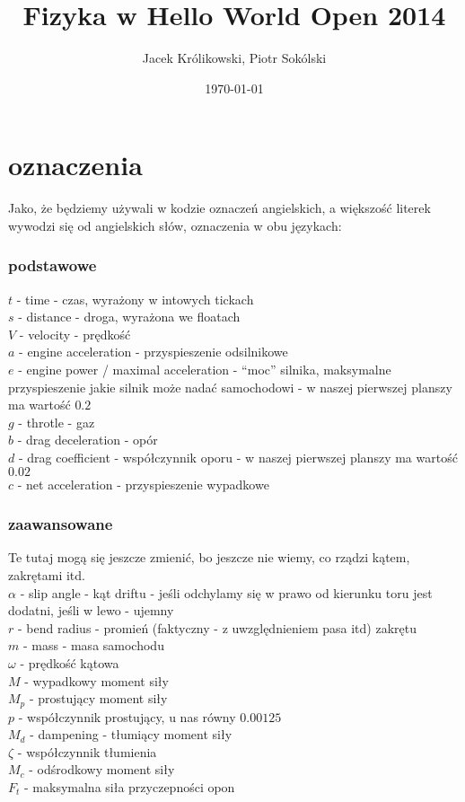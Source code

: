 \documentclass[12pt]{article}
\title{Fizyka w Hello World Open 2014}
\author{Jacek Królikowski, Piotr Sokólski}
\date{\today}
\begin{document}
\sloppy
\maketitle
\section{oznaczenia}
Jako, że będziemy używali w kodzie oznaczeń angielskich, a większość literek wywodzi się od angielskich słów, oznaczenia w obu językach:

\subsubsection{podstawowe}
$t$ - time - czas, wyrażony w intowych tickach \\
$s$ - distance - droga, wyrażona we floatach \\
$V$ - velocity - prędkość \\
$a$ - engine acceleration - przyspieszenie odsilnikowe \\
$e$ - engine power / maximal acceleration - ``moc'' silnika, maksymalne przyspieszenie jakie silnik może nadać samochodowi - w naszej pierwszej planszy ma wartość $0.2$  \\
$g$ - throtle - gaz \\
$b$ - drag deceleration - opór \\
$d$ - drag coefficient - współczynnik oporu - w naszej pierwszej planszy ma wartość $0.02$ \\
$c$ - net acceleration - przyspieszenie wypadkowe
\subsubsection{zaawansowane}
Te tutaj mogą się jeszcze zmienić, bo jeszcze nie wiemy, co rządzi kątem, zakrętami itd.\\
$\alpha$ - slip angle - kąt driftu - jeśli odchylamy się w prawo od kierunku toru jest dodatni, jeśli w lewo - ujemny\\
$r$ - bend radius - promień (faktyczny - z uwzględnieniem pasa itd) zakrętu\\
$m$ - mass - masa samochodu \\
$\omega$ - prędkość kątowa \\
$M$ - wypadkowy moment siły \\
$M_p$ - prostujący moment siły \\
$p$ - współczynnik prostujący, u nas równy $0.00125$\\
$M_d$ - dampening - tłumiący moment siły \\
$\zeta$ - współczynnik tłumienia\\
$M_c$ - odśrodkowy moment siły \\
$F_t$ - maksymalna siła przyczepności opon \\
\end{document}
